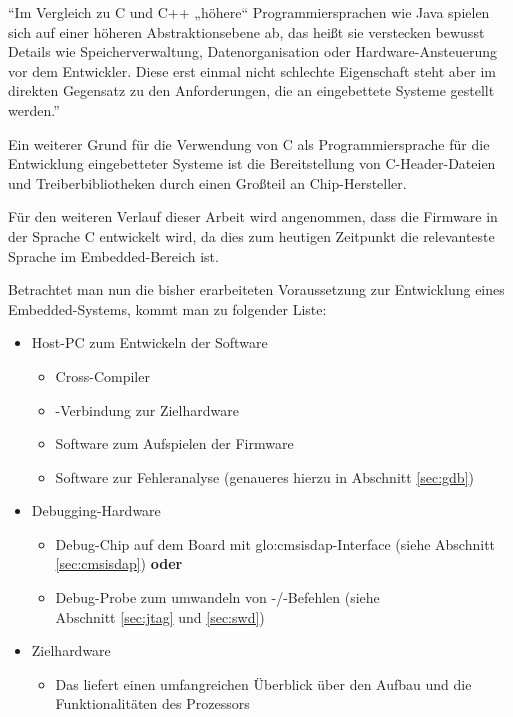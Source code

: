     ``Im Vergleich zu C und C++ „höhere“ Programmiersprachen wie Java spielen sich auf einer höheren Abstraktionsebene
    ab, das heißt sie verstecken bewusst Details wie Speicherverwaltung, Datenorganisation oder Hardware-Ansteuerung vor
    dem Entwickler. Diese erst einmal nicht schlechte Eigenschaft steht aber im direkten Gegensatz zu den Anforderungen,
    die an eingebettete Systeme gestellt werden.''\citep[Kap.~1.1]{Asche2017}

    Ein weiterer Grund für die Verwendung von C als Programmiersprache für die Entwicklung eingebetteter Systeme ist die
    Bereitstellung von C-Header-Dateien und Treiberbibliotheken durch einen Großteil an Chip-Hersteller.

    Für den weiteren Verlauf dieser Arbeit wird angenommen, dass die Firmware in der Sprache C entwickelt wird, da dies
    zum heutigen Zeitpunkt die relevanteste Sprache im Embedded-Bereich ist.

    Betrachtet man nun die bisher erarbeiteten Voraussetzung zur Entwicklung eines Embedded-Systems, kommt man zu
    folgender Liste:
    \begin{itemize}
        \item Host-PC zum Entwickeln der Software
        \begin{itemize}
            \item Cross-Compiler
            \item {}-Verbindung zur Zielhardware
            \item Software zum Aufspielen der Firmware
            \item Software zur Fehleranalyse (genaueres hierzu in Abschnitt \ref{sec:gdb})
        \end{itemize}
        \item Debugging-Hardware
        \begin{itemize}
            \item Debug-Chip auf dem Board mit \acrshort{glo:cmsisdap}-Interface (siehe Abschnitt \ref{sec:cmsisdap}) \textbf{oder}
            \item Debug-Probe zum umwandeln von \hyp{}/\hyp{}Befehlen (siehe\\Abschnitt \ref{sec:jtag} und \ref{sec:swd})
        \end{itemize}
        \item Zielhardware
        \begin{itemize}
            \item Das  liefert einen umfangreichen Überblick über den Aufbau und die Funktionalitäten des
            Prozessors
        \end{itemize}
    \end{itemize}
